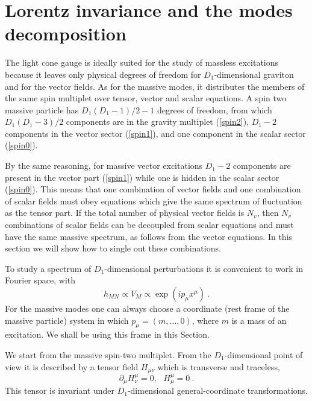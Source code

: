 \documentclass[a4paper,12pt]{article}
\begin{document}
\section{Lorentz invariance and the modes decomposition}

The light cone gauge is ideally suited for the study of massless
excitations because it leaves only  physical degrees of freedom for
$D_1$-dimensional graviton and for the vector fields. As for the
massive modes, it distributes the members of the same spin multiplet
over tensor, vector and scalar equations.   A spin two massive
particle has $D_1(D_1-1)/2-1$ degrees of freedom, from which
$D_1(D_1-3)/2$ components are in the gravity multiplet
(\ref{spin2}),  $D_1-2$ components in the vector sector
(\ref{spin1}), and one component in the scalar sector (\ref{spin0}).

By the same reasoning, for massive vector excitations $D_1-2$
components are present in the vector part (\ref{spin1}) while one is
hidden in the scalar sector (\ref{spin0}). This means that one
combination of vector fields and one combination of scalar fields
must obey  equations which give the same spectrum of fluctuation  as
the tensor part. If the total number of physical vector fields is
$N_v$, then $N_v$ combinations of scalar fields can be decoupled from
scalar equations and must have the same massive spectrum, as follows
from the vector equations. In this section we will show how to single
out these combinations.

To study a spectrum of $D_1$-dimensional perturbations it is
convenient to work in Fourier space, with
\begin{equation}
h_{MN} \propto V_{M} \propto  \exp{(i p_{\mu}x^{\mu})}~.
\end{equation}
For the massive modes one can always choose a coordinate (rest frame
of the massive particle) system in which $p_{\mu} = (m,\dots,0)$,
where $m$ is a mass of an excitation. We shall be using this frame in
this Section.

We start from the massive spin-two multiplet. From the
$D_1$-dimensional point of view it is described by a tensor field
$H_{\mu\nu}$ which is transverse and traceless,
\begin{equation}
\partial_\mu H^\mu_\nu=0,~~~
H^\mu_\mu=0~.
\label{4dtens}
\end{equation}
This tensor is invariant under $D_1$-dimensional general-coordinate
transformations.
\end{document}

